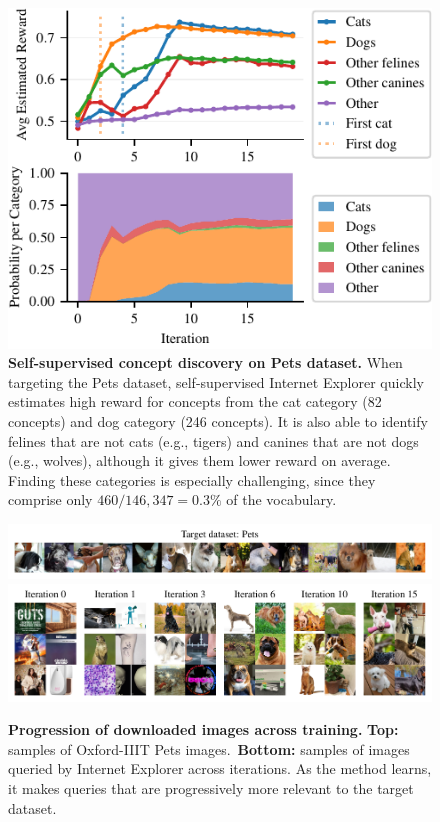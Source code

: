 \begin{figure}[t]
\centering
\includegraphics[width=0.675\linewidth]{figures/pets_ssl_reward_over_training2.pdf}
\caption{\textbf{Self-supervised concept discovery on Pets dataset.} When targeting the Pets dataset, self-supervised Internet Explorer quickly estimates high reward for concepts from the cat category (82 concepts) and dog category (246 concepts). It is also able to identify felines that are not cats (e.g., tigers) and canines that are not dogs (e.g., wolves), although it gives them lower reward on average. Finding these categories is especially challenging, since they comprise only $460/146{,}347 = 0.3\%$ of the vocabulary.}
\label{fig:reward_over_training}
\end{figure}



\begin{figure}[t]
    \centering
    \includegraphics[width=\linewidth]{figures/pets_targets.pdf}\\
    \includegraphics[width=\linewidth]{figures/pets-progression-962-2col-3row.pdf}
    \caption{
    \textbf{Progression of downloaded images across training.} \textbf{Top:} samples of Oxford-IIIT Pets images.\ \textbf{Bottom:} samples of images queried by Internet Explorer across iterations. As the method learns, it makes queries that are progressively more relevant to the target dataset.
    }
    \label{fig:progression}
    \vspace{-0.15in}
\end{figure}

